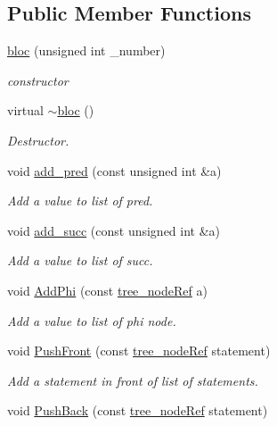 \subsection*{Public Member Functions}
\begin{DoxyCompactItemize}
\item 
\hyperlink{structbloc_af2b131aef8fd51742dc6f4c34b303a88}{bloc} (unsigned int \+\_\+number)
\begin{DoxyCompactList}\small\item\em constructor \end{DoxyCompactList}\item 
virtual \hyperlink{structbloc_a68257893dd884fac2e0fb0b279262566}{$\sim$bloc} ()
\begin{DoxyCompactList}\small\item\em Destructor. \end{DoxyCompactList}\item 
void \hyperlink{structbloc_a89e0e5895060e4c29dfd1ece24d509f3}{add\+\_\+pred} (const unsigned int \&a)
\begin{DoxyCompactList}\small\item\em Add a value to list of pred. \end{DoxyCompactList}\item 
void \hyperlink{structbloc_a62a5f0d5a5249e803702c15acd3b433d}{add\+\_\+succ} (const unsigned int \&a)
\begin{DoxyCompactList}\small\item\em Add a value to list of succ. \end{DoxyCompactList}\item 
void \hyperlink{structbloc_ae0aa810f7bc461f0166232a5f23d4760}{Add\+Phi} (const \hyperlink{tree__node_8hpp_a6ee377554d1c4871ad66a337eaa67fd5}{tree\+\_\+node\+Ref} a)
\begin{DoxyCompactList}\small\item\em Add a value to list of phi node. \end{DoxyCompactList}\item 
void \hyperlink{structbloc_ad0a606ca6ec3d5ae878d23925dea6276}{Push\+Front} (const \hyperlink{tree__node_8hpp_a6ee377554d1c4871ad66a337eaa67fd5}{tree\+\_\+node\+Ref} statement)
\begin{DoxyCompactList}\small\item\em Add a statement in front of list of statements. \end{DoxyCompactList}\item 
void \hyperlink{structbloc_ae5b558b58df6da7f27f07bc64eac9c68}{Push\+Back} (const \hyperlink{tree__node_8hpp_a6ee377554d1c4871ad66a337eaa67fd5}{tree\+\_\+node\+Ref} statement)

\end{DoxyCompactItemize}
